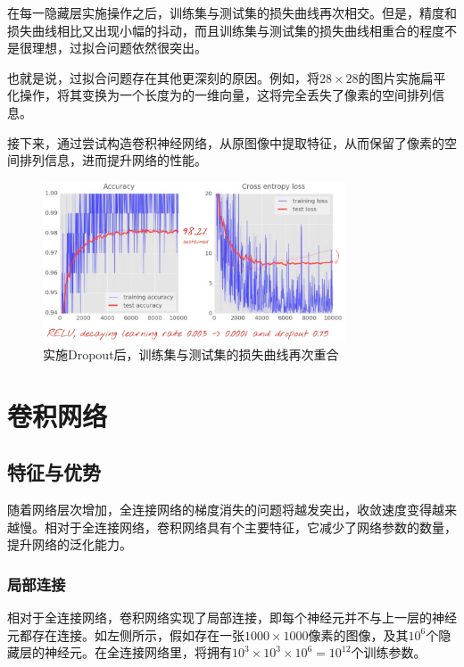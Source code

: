 \begin{content}
\begin{content}
在每一隐藏层实施操作之后，训练集与测试集的损失曲线再次相交。但是，精度和损失曲线相比又出现小幅的抖动，而且训练集与测试集的损失曲线相重合的程度不是很理想，过拟合问题依然很突出。

也就是说，过拟合问题存在其他更深刻的原因。例如，将$ 28 \times 28 $的图片实施扁平化操作，将其变换为一个长度为的一维向量，这将完全丢失了像素的空间排列信息。

接下来，通过尝试构造卷积神经网络，从原图像中提取特征，从而保留了像素的空间排列信息，进而提升网络的性能。

\begin{figure}[H]
\centering
\includegraphics[width=0.8\textwidth]{figures/mnist-apply-dropout-result.png}
\caption{实施Dropout后，训练集与测试集的损失曲线再次重合}
 \label{fig:mnist-apply-dropout-result}
\end{figure}

\end{content}

\section{卷积网络}

\begin{content}

\subsection{特征与优势}

随着网络层次增加，全连接网络的梯度消失的问题将越发突出，收敛速度变得越来越慢。相对于全连接网络，卷积网络具有个主要特征，它减少了网络参数的数量，提升网络的泛化能力。

\subsubsection{局部连接}

相对于全连接网络，卷积网络实现了局部连接，即每个神经元并不与上一层的神经元都存在连接。如左侧所示，假如存在一张$ 1000 \times 1000 $像素的图像，及其$ 10^6 $个隐藏层的神经元。在全连接网络里，将拥有$ 10^3 \times 10^3 \times 10^6 = 10^{12} $个训练参数。


\end{content}
\end{content}
